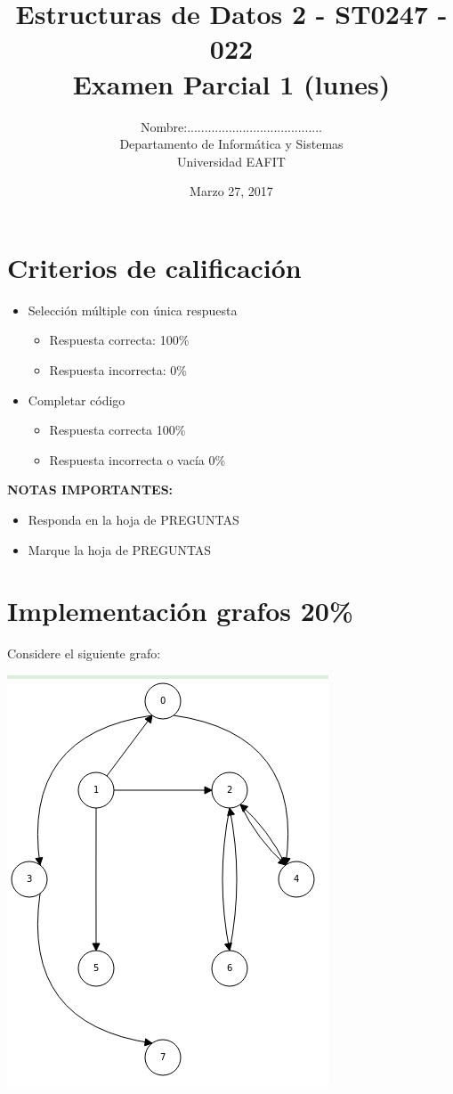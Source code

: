 \documentclass[twocolumn]{article}
\author{
Nombre:....................................... \\
    Departamento de Informática y Sistemas \\
    Universidad EAFIT \\
}
\title{
    Estructuras de Datos 2 - ST0247 - 022 \\
    Examen Parcial 1 (lunes)
}
\date{
    Marzo 27, 2017
}
\begin{document}
\vspace{-5cm}
\maketitle


\section*{Criterios de calificación}

\begin{itemize}
\item Selección múltiple con única respuesta
\begin{itemize}
\item Respuesta correcta: 100\%
\item Respuesta incorrecta: 0\%
\end{itemize}

\item Completar código
\begin{itemize}
\item Respuesta correcta 100\%
\item Respuesta incorrecta o vacía 0\%
\end{itemize}
\end{itemize}

\vspace{1cm}

\textbf{NOTAS IMPORTANTES:}
\begin{itemize}
	\item Responda en la hoja de PREGUNTAS
	\item Marque la hoja de PREGUNTAS
\end{itemize}


\section{Implementación grafos 20\%}
Considere el siguiente grafo:

\begin{center}
\includegraphics[scale=0.5]{grafin.png}
\end{center}
\end{document}
